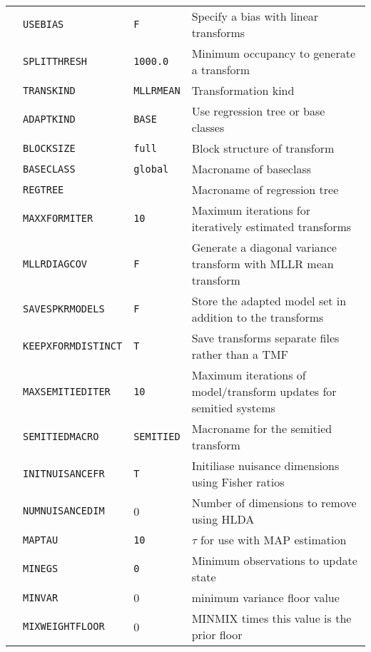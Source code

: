 \begin{center}
\begin{supertabular}{|p{1.8cm}|l|l|p{6.6cm}|}
  & \texttt{USEBIAS} & \texttt{F} & Specify a bias with linear transforms \\ 
  & \texttt{SPLITTHRESH} & \texttt{1000.0} & Minimum occupancy to generate a transform \\ 
  & \texttt{TRANSKIND} & \texttt{{\tt MLLRMEAN}} & Transformation kind \\ 
  & \texttt{ADAPTKIND} & \texttt{{\tt BASE}} & Use regression tree or base classes \\ 
  & \texttt{BLOCKSIZE} & \texttt{full} & Block structure of transform\\ 
  & \texttt{BASECLASS} & \texttt{global} & Macroname of baseclass\\ 
  & \texttt{REGTREE} & \texttt{} & Macroname of regression tree\\ 
   & \texttt{MAXXFORMITER} & \texttt{10} & Maximum iterations for iteratively estimated transforms \\ 
  & \texttt{MLLRDIAGCOV} & \texttt{F} & Generate a diagonal variance transform with MLLR mean transform \\ 
  & \texttt{SAVESPKRMODELS} & \texttt{F} & Store the adapted model set in addition to the transforms \\ 
  & \texttt{KEEPXFORMDISTINCT} & \texttt{T} & Save transforms separate files rather than a TMF \\ 
  & \texttt{MAXSEMITIEDITER} & \texttt{10} & Maximum iterations of model/transform updates for semitied systems \\ 
  & \texttt{SEMITIEDMACRO} & \texttt{SEMITIED} & Macroname for the semitied transform\\ 
  & \texttt{INITNUISANCEFR} & \texttt{T} & Initiliase nuisance dimensions using Fisher ratios\\ 
  & \texttt{NUMNUISANCEDIM} & 0 & Number of dimensions to remove using HLDA\\ \hline



  & \texttt{MAPTAU} & \texttt{10} & $\tau$ for use with MAP estimation \\ 
  & \texttt{MINEGS} & \texttt{0} & Minimum observations to update state \\ 
  & \texttt{MINVAR} & 0 & minimum variance floor value \\ 
  & \texttt{MIXWEIGHTFLOOR} & 0 & MINMIX times this value is the prior floor \\ \hline


\end{supertabular}
\end{center}
